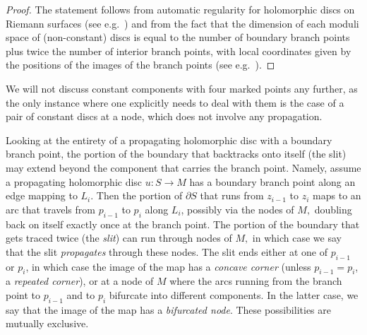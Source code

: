 \documentclass[11pt,leqno]{amsart}
\numberwithin{equation}{section}
\begin{document}
\begin{proof}
The statement follows from automatic regularity for 
holomorphic discs on Riemann surfaces (see e.g.\ \cite[\S 13]{SeBook})
and from the fact that the dimension of each moduli space of (non-constant)
discs is equal to the number of boundary branch points plus twice the number 
of interior branch points, with local coordinates given by the positions of the
images of the branch points (see e.g.\ \cite[Proposition 7.8]{ENS}).
\end{proof}

We will not discuss constant components with four marked points any further, 
as the only instance where one explicitly needs to deal
with them is the case of a pair of constant discs at a node, which does not involve any propagation.


Looking at the entirety of a propagating holomorphic disc with a boundary
branch point, the portion of the boundary that backtracks onto itself (the
slit) may extend beyond the component that carries the branch point. Namely,
assume a propagating holomorphic disc $u:S\to M$ has a boundary branch point along an
edge mapping to $L_i$. Then the portion of $\partial S$ that runs from
$z_{i-1}$ to $z_i$ maps to an arc that
travels from $p_{i-1}$ to $p_i$ along $L_i$, possibly via the nodes of $M,$
doubling back on itself exactly once at
the branch point. The portion of the boundary that gets traced twice (the {\em slit}) can run through nodes of $M,$ in which case we say that the
slit {\em propagates} through these nodes.
The slit ends either at one of
$p_{i-1}$ or $p_i$, in which case the image of the map has a {\em concave
corner} (unless $p_{i-1}=p_i$, a {\em repeated corner}), or at a node of $M$ where the arcs running from the branch point to
$p_{i-1}$ and to $p_i$ bifurcate into different components. In the latter case,
we say that the image of the map has a {\em bifurcated node}.
These possibilities are mutually exclusive.
\end{document}
